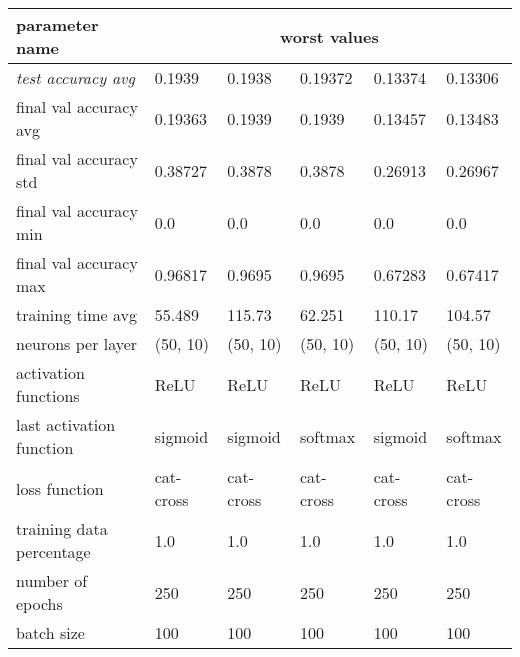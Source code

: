 \begin{longtable}{|l|l|l|l|l|>{\columncolor{worstColumnColor}}l|}
\hline
\textbf{parameter name} & \multicolumn{5}{c|}{\textbf{worst values}} \\
\hline
\textit{test accuracy avg} &  0.1939 &  0.1938 & 0.19372 & 0.13374 & 0.13306 \\
final val accuracy avg   & 0.19363 & 0.1939  & 0.1939  & 0.13457 & 0.13483 \\
final val accuracy std   & 0.38727 & 0.3878  & 0.3878  & 0.26913 & 0.26967 \\
{\color{equalParamColor} final val accuracy min } & {\color{equalParamColor} 0.0 } & {\color{equalParamColor} 0.0 } & {\color{equalParamColor} 0.0 } & {\color{equalParamColor} 0.0 } & {\color{equalParamColor} 0.0 } \\
final val accuracy max   & 0.96817 & 0.9695  & 0.9695  & 0.67283 & 0.67417 \\
training time avg        & 55.489  & 115.73  & 62.251  & 110.17  & 104.57  \\
{\color{equalParamColor} neurons per layer } & {\color{equalParamColor} (50, 10) } & {\color{equalParamColor} (50, 10) } & {\color{equalParamColor} (50, 10) } & {\color{equalParamColor} (50, 10) } & {\color{equalParamColor} (50, 10) } \\
{\color{equalParamColor} activation functions } & {\color{equalParamColor} ReLU } & {\color{equalParamColor} ReLU } & {\color{equalParamColor} ReLU } & {\color{equalParamColor} ReLU } & {\color{equalParamColor} ReLU } \\
last activation function & sigmoid & sigmoid & softmax & sigmoid & softmax \\
{\color{equalParamColor} loss function } & {\color{equalParamColor} cat-cross } & {\color{equalParamColor} cat-cross } & {\color{equalParamColor} cat-cross } & {\color{equalParamColor} cat-cross } & {\color{equalParamColor} cat-cross } \\
{\color{equalParamColor} training data percentage } & {\color{equalParamColor} 1.0 } & {\color{equalParamColor} 1.0 } & {\color{equalParamColor} 1.0 } & {\color{equalParamColor} 1.0 } & {\color{equalParamColor} 1.0 } \\
{\color{equalParamColor} number of epochs } & {\color{equalParamColor} 250 } & {\color{equalParamColor} 250 } & {\color{equalParamColor} 250 } & {\color{equalParamColor} 250 } & {\color{equalParamColor} 250 } \\
{\color{equalParamColor} batch size } & {\color{equalParamColor} 100 } & {\color{equalParamColor} 100 } & {\color{equalParamColor} 100 } & {\color{equalParamColor} 100 } & {\color{equalParamColor} 100 } \\

\end{longtable}

